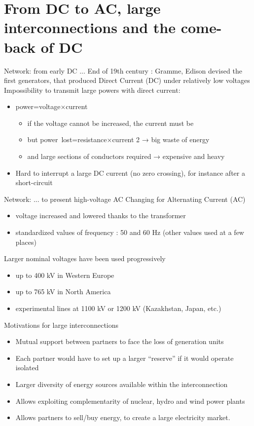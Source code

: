 \section{From DC to AC, large interconnections and the come-back of DC}

\begin{frame}
{Network: from early DC ...}
End of 19th century : Gramme, Edison devised the first generators, that produced Direct Current (DC) under relatively low voltages
Impossibility to transmit large powers with direct current:
\begin{itemize}
\item power=voltage×current
\begin{itemize}
\item if the voltage cannot be increased, the current must be
\item but power lost=resistance×current 
2
  → big waste of energy
\item and large sections of conductors required → expensive and heavy
\end{itemize}
\item Hard to interrupt a large DC current (no zero crossing), for instance after a short-circuit
\end{itemize}
\end{frame}

\begin{frame}
{Network: ... to present high-voltage AC}
Changing for Alternating Current (AC)
\begin{itemize}
\item voltage increased and lowered thanks to the transformer
\item standardized values of frequency : 50 and 60 Hz (other values used at a few places)
\end{itemize}
Larger nominal voltages have been used progressively
\begin{itemize}
\item up to 400 kV in Western Europe
\item up to 765 kV in North America
\item experimental lines at 1100 kV or 1200 kV (Kazakhstan, Japan, etc.)
\end{itemize}
\end{frame}

\begin{frame}
{Motivations for large interconnections}
\begin{itemize}
\item Mutual support between partners to face the loss of generation units
\item Each partner would have to set up a larger “reserve” if it would operate isolated
\item Larger diversity of energy sources available within the interconnection
\item Allows exploiting complementarity of nuclear, hydro and wind power plants
\item Allows partners to sell/buy energy, to create a large electricity market.
\end{itemize}
\end{frame}

